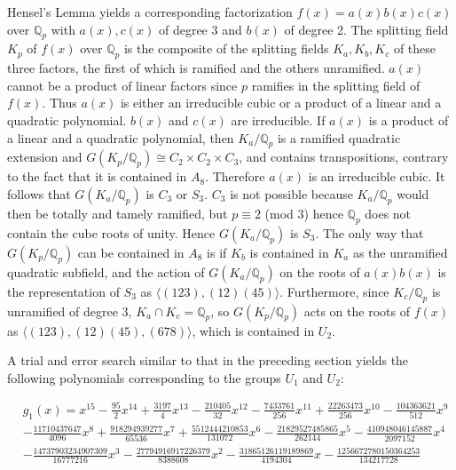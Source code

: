 \documentclass[reqno,12pt]{amsart}
\theoremstyle{remark}
\theoremstyle{definition}
\theoremstyle{citing}
\numberwithin{theorem}{section}
\numberwithin{equation}{section}
\begin{document}
  Hensel's Lemma yields a corresponding factorization  $f(x)=a(x)b(x)c(x)$ over $\mathbb{Q}_p$ with $a(x),c(x)$ of degree 3 and $b(x)$ of degree 2.  The splitting field $K_p$ of $f(x)$ over $\mathbb{Q}_p$ is the composite of the splitting fields $K_a,K_b,K_c$ of these three factors, the first of which is ramified and the others unramified.  $a(x)$ cannot be a product of linear factors since $p$ ramifies in the splitting field of $f(x)$.  Thus $a(x)$ is either an irreducible cubic or a product of a linear and a quadratic polynomial.  $b(x)$ and $c(x)$ are irreducible.  If $a(x)$ is
 a product of a linear and a quadratic polynomial, then $K_a/\mathbb{Q}_p$ is a ramified quadratic extension and $G(K_p/\mathbb{Q}_p)\cong C_2\times C_2 \times C_3$, and contains transpositions, contrary to the fact that it is contained in $A_8$.  Therefore $a(x)$ is  an irreducible cubic.  It follows that $G(K_a/{{\mathbb{{Q}}}}_p)$ is $C_3$ or $S_3$.  $C_3$ is not possible because $K_a/{{\mathbb{{Q}}}}_p$ would then be totally and tamely ramified, but $p \equiv 2$ (mod 3) hence ${{\mathbb{{Q}}}}_p$ does not contain the cube roots of unity.  Hence  $G(K_a/{{\mathbb{{Q}}}}_p)$ is  $S_3$.  The only way that $G(K_p/\mathbb{Q}_p)$ can be contained in $A_8$ is if $K_b$ is contained in $K_a$ as the unramified quadratic subfield, and the action of $G(K_a/{{\mathbb{{Q}}}}_p)$ on the roots of $a(x)b(x)$ is the representation of $S_3$ as $\langle (123),(12)(45) \rangle$.  Furthermore, since $K_c/{{\mathbb{{Q}}}}_p$ is unramified of degree $3$, $K_a\cap K_c={{\mathbb{{Q}}}}_p$, so $G(K_p/\mathbb{Q}_p)$ acts on the roots of $f(x)$ as $\langle(123),(12)(45),(678)\rangle$, which is contained in $U_2$.

 A trial and error search similar to that in the preceding section yields the following polynomials corresponding to the groups $U_{1}$ and $U_{2}$:

\begin{eqnarray*}
 & g_{1}(x)=x^{15}-\frac{95}{2}x^{14}+\frac{3197}{4}x^{13}-\frac{210405}{32}x^{12}-\frac{7433761}{256}x^{11}+\frac{22263473}{256}x^{10}-\frac{104363621}{512}x^{9}\\
 & -\frac{11710437647}{4096}x^{8}+\frac{918294939277}{65536}x^{7}+\frac{5512444210853}{131072}x^{6}-\frac{21829527485865}{262144}x^{5}-\frac{410948046145887}{2097152}x^{4}\\
 & -\frac{14737903234907309}{16777216}x^{3}-\frac{27794916917226379}{8388608}x^{2}-\frac{31865126119189869}{4194304}x-\frac{1256672780150364253}{134217728}\end{eqnarray*}
\end{document}
